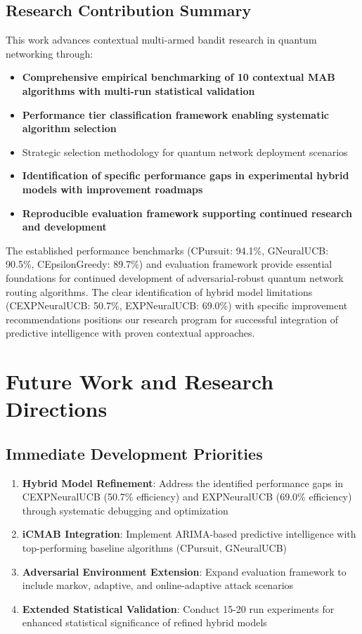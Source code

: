\documentclass[12pt,a4paper]{article}
\newcommand{\performance}[1]{\textcolor{performancecolor}{\textbf{#1}}}
\newcommand{\stochastic}[1]{\textcolor{stochasticcolor}{\textbf{#1}}}
\newcommand{\highlight}[1]{\colorbox{highlightcolor}{#1}}
\newcommand{\critical}[1]{\textcolor{criticalcolor}{\textbf{#1}}}
\newcommand{\success}[1]{\textcolor{successcolor}{\textbf{#1}}}
\begin{document}
\subsection{Research Contribution Summary}

This work advances contextual multi-armed bandit research in quantum networking through:

\begin{itemize}
\item \performance{Comprehensive empirical benchmarking of 10 contextual MAB algorithms with multi-run statistical validation}
\item \success{Performance tier classification framework enabling systematic algorithm selection}
\item \highlight{Strategic selection methodology for quantum network deployment scenarios}
\item \stochastic{Identification of specific performance gaps in experimental hybrid models with improvement roadmaps}
\item \critical{Reproducible evaluation framework supporting continued research and development}
\end{itemize}

The established performance benchmarks (CPursuit: 94.1\%, GNeuralUCB: 90.5\%, CEpsilonGreedy: 89.7\%) and evaluation framework provide essential foundations for continued development of adversarial-robust quantum network routing algorithms. The clear identification of hybrid model limitations (CEXPNeuralUCB: 50.7\%, EXPNeuralUCB: 69.0\%) with specific improvement recommendations positions our research program for successful integration of predictive intelligence with proven contextual approaches.

\section{Future Work and Research Directions}

\subsection{Immediate Development Priorities}

\begin{enumerate}
\item \textbf{Hybrid Model Refinement}: Address the identified performance gaps in CEXPNeuralUCB (50.7\% efficiency) and EXPNeuralUCB (69.0\% efficiency) through systematic debugging and optimization
\item \textbf{iCMAB Integration}: Implement ARIMA-based predictive intelligence with top-performing baseline algorithms (CPursuit, GNeuralUCB)
\item \textbf{Adversarial Environment Extension}: Expand evaluation framework to include markov, adaptive, and online-adaptive attack scenarios
\item \textbf{Extended Statistical Validation}: Conduct 15-20 run experiments for enhanced statistical significance of refined hybrid models
\end{enumerate}
\end{document}
